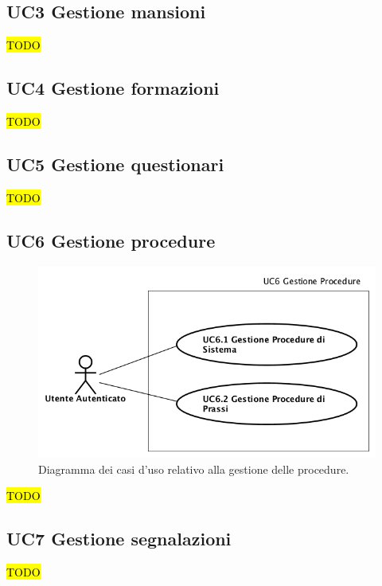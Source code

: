 	\subsection{UC3 Gestione  mansioni}
		\label{section:UC3}
		\hl{TODO}
	\subsection{UC4 Gestione formazioni}
		\label{section:UC4}
		\hl{TODO}
	\subsection{UC5 Gestione questionari}
		\label{section:UC5}	
		\hl{TODO}
	\subsection{UC6 Gestione procedure}
		\label{section:UC6}
			\begin{figure}[H]
				\begin{center}
					\includegraphics[width=12cm]{Pics/UC6GestioneProcedure.png}
					\caption{Diagramma dei casi d'uso relativo alla gestione delle procedure.}
					\label{fig:UC6_Procedure}
				\end{center}
			\end{figure}
		\hl{TODO}
	\subsection{UC7 Gestione segnalazioni}
		\label{section:UC7}	
		\hl{TODO}
